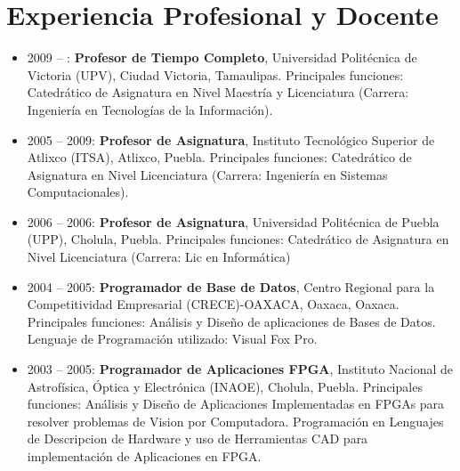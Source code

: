 \documentclass[letterpaper,10pt]{article}
\newcounter{num}
\begin{document}
\section{Experiencia Profesional y Docente}
 \begin{itemize}[leftmargin=0.15in, label={}]
\item 2009 -- \the\year{}: \textbf{Profesor de Tiempo Completo}, Universidad Politécnica de Victoria (UPV), Ciudad Victoria, Tamaulipas.  Principales funciones: Catedrático de Asignatura en Nivel Maestría y Licenciatura (Carrera: Ingenier\'ia en Tecnologías de la Información).

\item 2005 -- 2009: \textbf{Profesor de Asignatura}, Instituto Tecnol\'ogico Superior de Atlixco (ITSA), Atlixco, Puebla. Principales funciones: Catedrático de Asignatura en Nivel Licenciatura (Carrera: Ingenier\'ia en Sistemas     Computacionales). 

\item 2006 -- 2006: \textbf{Profesor de Asignatura}, Universidad Polit\'ecnica de Puebla (UPP), Cholula, Puebla. Principales funciones: Catedrático de Asignatura en Nivel Licenciatura (Carrera: Lic en Inform\'atica) 

\item 2004 -- 2005: \textbf{Programador de Base de Datos}, Centro Regional para la Competitividad Empresarial (CRECE)-OAXACA, Oaxaca, Oaxaca. Principales funciones: An\'alisis y Dise\~no de aplicaciones de Bases de Datos. Lenguaje de Programaci\'on utilizado: Visual Fox Pro. 

\item 2003 -- 2005: \textbf{Programador de Aplicaciones FPGA}, Instituto Nacional de Astrofísica, Óptica y Electrónica (INAOE), Cholula, Puebla. Principales funciones: Análisis y Diseño de Aplicaciones Implementadas en FPGAs para resolver problemas de Vision por Computadora. Programación en Lenguajes de Descripcion de Hardware y uso de Herramientas CAD para implementación de Aplicaciones en FPGA. 

 \end{itemize}
\end{document}
